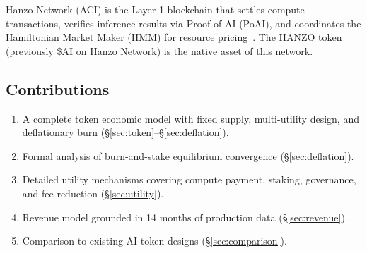 Hanzo Network (ACI) is the Layer-1 blockchain that settles compute transactions,
verifies inference results via Proof of AI (PoAI), and coordinates the
Hamiltonian Market Maker (HMM) for resource pricing~\cite{hanzoaci,
hanzonetwork}. The HANZO token (previously \$AI on Hanzo Network) is the native
asset of this network.

\subsection{Contributions}

\begin{enumerate}[leftmargin=1.4em]
    \item A complete token economic model with fixed supply, multi-utility design,
    and deflationary burn (\S\ref{sec:token}--\S\ref{sec:deflation}).
    \item Formal analysis of burn-and-stake equilibrium convergence
    (\S\ref{sec:deflation}).
    \item Detailed utility mechanisms covering compute payment, staking,
    governance, and fee reduction (\S\ref{sec:utility}).
    \item Revenue model grounded in 14 months of production data
    (\S\ref{sec:revenue}).
    \item Comparison to existing AI token designs (\S\ref{sec:comparison}).
\end{enumerate}

